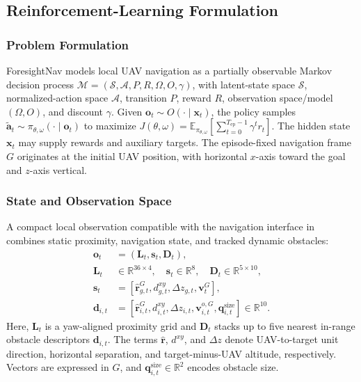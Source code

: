 \documentclass[letterpaper, 10 pt, conference]{ieeeconf}
\begin{document}
\subsection{Reinforcement-Learning Formulation}\label{subsec:rl}

\subsubsection{Problem Formulation}
ForesightNav models local UAV navigation as a partially observable Markov decision process \(\mathcal{M}=(\mathcal{S},\mathcal{A},P,R,\Omega,O,\gamma)\), with latent-state space \(\mathcal{S}\), normalized-action space \(\mathcal{A}\), transition \(P\), reward \(R\), observation space/model \((\Omega,O)\), and discount \(\gamma\). Given \(\mathbf{o}_t\sim O(\cdot\mid\mathbf{x}_t)\), the policy samples \(\tilde{\mathbf{a}}_t\sim\pi_{\theta,\omega}(\cdot\mid\mathbf{o}_t)\) to maximize \(J(\theta,\omega)=\mathbb{E}_{\pi_{\theta,\omega}}[\sum_{t=0}^{T_{\mathrm{ep}}-1}\gamma^t r_t]\). The hidden state \(\mathbf{x}_t\) may supply rewards and auxiliary targets. The episode-fixed navigation frame \(G\) originates at the initial UAV position, with horizontal \(x\)-axis toward the goal and \(z\)-axis vertical.

\subsubsection{State and Observation Space}
A compact local observation compatible with the navigation interface in~\cite{navrl} combines static proximity, navigation state, and tracked dynamic obstacles:
\begin{equation}
	\begin{aligned}
	\mathbf{o}_t&=(\mathbf{L}_t,\mathbf{s}_t,\mathbf{D}_t),\\
	\mathbf{L}_t&\in\mathbb{R}^{36\times4},\quad
	\mathbf{s}_t\in\mathbb{R}^{8},\quad
	\mathbf{D}_t\in\mathbb{R}^{5\times10},\\
	\mathbf{s}_t&=
	[\hat{\mathbf{r}}_{g,t}^{G},d_{g,t}^{xy},
	\Delta z_{g,t},\mathbf{v}_t^{G}],\\
	\mathbf{d}_{i,t}&=
	[\hat{\mathbf{r}}_{i,t}^{G},d_{i,t}^{xy},\Delta z_{i,t},
	\mathbf{v}_{i,t}^{o,G},\mathbf{q}_{i,t}^{\mathrm{size}}]
	\in\mathbb{R}^{10}.
	\end{aligned}
	\label{eq:policy_observation}
\end{equation}
Here, \(\mathbf{L}_t\) is a yaw-aligned proximity grid and \(\mathbf{D}_t\) stacks up to five nearest in-range obstacle descriptors \(\mathbf{d}_{i,t}\). The terms \(\hat{\mathbf r}\), \(d^{xy}\), and \(\Delta z\) denote UAV-to-target unit direction, horizontal separation, and target-minus-UAV altitude, respectively. Vectors are expressed in \(G\), and \(\mathbf{q}_{i,t}^{\mathrm{size}}\in\mathbb{R}^2\) encodes obstacle size.
\end{document}
